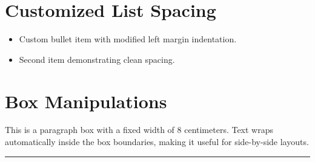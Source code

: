 \documentclass[12pt, a4paper]{article}
\begin{document}
\section*{Customized List Spacing}
\begin{itemize}[label=$\bullet$, leftmargin=*]
\item Custom bullet item with modified left margin indentation.
\item Second item demonstrating clean spacing.
\end{itemize}

\section*{Box Manipulations}
\noindent
{}

\vspace{0.5cm}
\noindent
\parbox{8cm}{
This is a paragraph box with a fixed width of 8 centimeters. Text wraps automatically inside the box boundaries, making it useful for side-by-side layouts.
}

\vspace{0.5cm}
\noindent
\rule{10cm}{0.5pt} %
\end{document}
